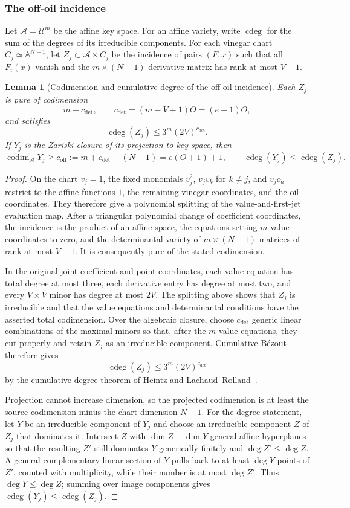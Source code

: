 \documentclass[10pt,a4paper]{article}
\newtheorem{lemma}[theorem]{Lemma}
\newcommand{\cU}{\mathcal U}
\newcommand{\codim}{\operatorname{codim}}
\newcommand{\cdeg}{\operatorname{cdeg}}
\newcommand{\off}{\mathrm{off}}
\begin{document}
\subsubsection{The off-oil incidence}

Let $\mathcal A=\cU^m$ be the affine key space.  For an affine variety, write $\cdeg$ for the sum of the degrees of its irreducible components.  For each vinegar chart $C_j\simeq\mathbb A^{N-1}$, let $Z_j\subset\mathcal A\times C_j$ be the incidence of pairs $(F,x)$ such that all $F_i(x)$ vanish and the $m\times(N-1)$ derivative matrix has rank at most $V-1$.

\begin{lemma}[Codimension and cumulative degree of the off-oil incidence]\label{lem:off-incidence}
Each $Z_j$ is pure of codimension
\[
m+c_{\det},\qquad c_{\det}=(m-V+1)O=(e+1)O,
\]
and satisfies
\[
\cdeg(Z_j)\le 3^m(2V)^{c_{\det}}.
\]
If $Y_j$ is the Zariski closure of its projection to key space, then
\[
\codim_{\mathcal A}Y_j\ge c_{\off}:=m+c_{\det}-(N-1)=e(O+1)+1,
\qquad
\cdeg(Y_j)\le\cdeg(Z_j).
\]
\end{lemma}

\begin{proof}
On the chart $v_j=1$, the fixed monomials $v_j^2$, $v_jv_k$ for $k\ne j$, and $v_jo_a$ restrict to the affine functions $1$, the remaining vinegar coordinates, and the oil coordinates.  They therefore give a polynomial splitting of the value-and-first-jet evaluation map.  After a triangular polynomial change of coefficient coordinates, the incidence is the product of an affine space, the equations setting $m$ value coordinates to zero, and the determinantal variety of $m\times(N-1)$ matrices of rank at most $V-1$.  It is consequently pure of the stated codimension.

In the original joint coefficient and point coordinates, each value equation has total degree at most three, each derivative entry has degree at most two, and every $V\times V$ minor has degree at most $2V$.  The splitting above shows that $Z_j$ is irreducible and that the value equations and determinantal conditions have the asserted total codimension.  Over the algebraic closure, choose $c_{\det}$ generic linear combinations of the maximal minors so that, after the $m$ value equations, they cut properly and retain $Z_j$ as an irreducible component.  Cumulative B\'ezout therefore gives
\[
\cdeg(Z_j)\le 3^m(2V)^{c_{\det}}
\]
by the cumulative-degree theorem of Heintz and Lachaud--Rolland~\cite{Heintz,LachaudRolland}.

Projection cannot increase dimension, so the projected codimension is at least the source codimension minus the chart dimension $N-1$.  For the degree statement, let $Y$ be an irreducible component of $Y_j$ and choose an irreducible component $Z$ of $Z_j$ that dominates it.  Intersect $Z$ with $\dim Z-\dim Y$ general affine hyperplanes so that the resulting $Z'$ still dominates $Y$ generically finitely and $\deg Z'\le\deg Z$.  A general complementary linear section of $Y$ pulls back to at least $\deg Y$ points of $Z'$, counted with multiplicity, while their number is at most $\deg Z'$.  Thus $\deg Y\le\deg Z$; summing over image components gives $\cdeg(Y_j)\le\cdeg(Z_j)$.
\end{proof}
\end{document}
